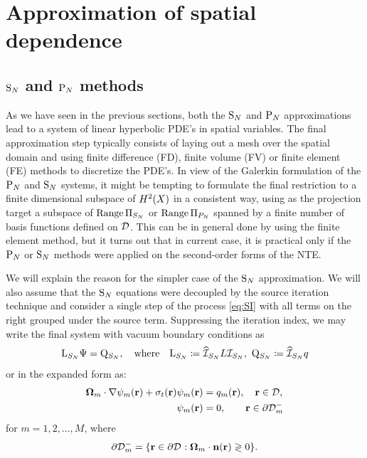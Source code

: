 \section{Approximation of spatial dependence}
\subsection{$\SN$ and $\PN$ methods}
As we have seen in the previous sections, both the $\SN$ and $\PN$ approximations lead to a system of linear
hyperbolic PDE's in spatial variables. The final approximation step typically consists of laying out a mesh  
over the spatial domain and using finite difference (FD), finite volume (FV) or finite element (FE) methods to
discretize the PDE's. 
In view of the Galerkin formulation of the $\PN$ and $\SN$ systems, it might be tempting to formulate the final
restriction to a finite dimensional subspace of $\Hp[2](X)$ in a consistent way, using as the projection target a
subspace of $\Rng\Projop[S_N]$ or $\Rng\Projop[P_N]$ spanned by a finite number of basis functions defined on $\VV$.
This can be in general done by using the finite element method, but it turns out that in current case, it is practical 
only if the $\PN$ or $\SN$ methods were applied on the second-order forms of the NTE. 

We will explain the reason for the
simpler case of the $\SN$ approximation. We will also assume that the $\SN$ equations were decoupled by the source
iteration technique and consider a single step of the process \eqref{eq:SI} with all terms on the right grouped under
the source term. Suppressing the iteration index, we may write the final system with vacuum boundary conditions as
\begin{equation}\label{eq:SNSI1}
	\mathrm{L}_{S_N} \Psi = \mathrm{Q}_{S_N},\quad\mbox{where}\quad \mathrm{L}_{S_N} \coloneqq \PihSN L \PiSN,\ \mathrm{Q}_{S_N}
	\coloneqq \PihSN q
\end{equation}
or in the expanded form as:
\begin{align}
	\bomega_m\cdot\nabla\psi_m(\br) + \sigma_t(\br)\psi_m(\br) &= q_m(\br),\quad \br \in \VV, \label{eq:SNSI2}\\
	\psi_m(\br) &= 0,\qquad \br \in \pVm[-]{m} \label{eq:SNSI2_bc}
\end{align}
for $m = 1,2,\ldots,M$,
where
$$
	\pVm[-]{m} = \{\br\in\pV : \bomega_m\cdot\bn(\br) \gtrless 0\}.
$$

